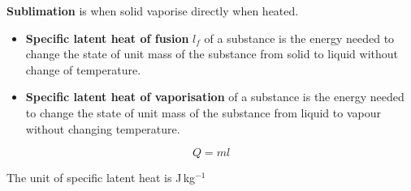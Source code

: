 \textbf{Sublimation} is when solid vaporise directly when heated.

\begin{itemize}
    \item \textbf{Specific latent heat of fusion} $l_f$ of a substance is the energy needed to change the state of unit mass of the substance from solid to liquid without change of temperature.
    \item \textbf{Specific latent heat of vaporisation} of a substance is the energy needed to change the state of unit mass of the substance from liquid to vapour without changing temperature.
\end{itemize}
$$Q=ml$$

The unit of specific latent heat is J\,kg$^{-1}$
